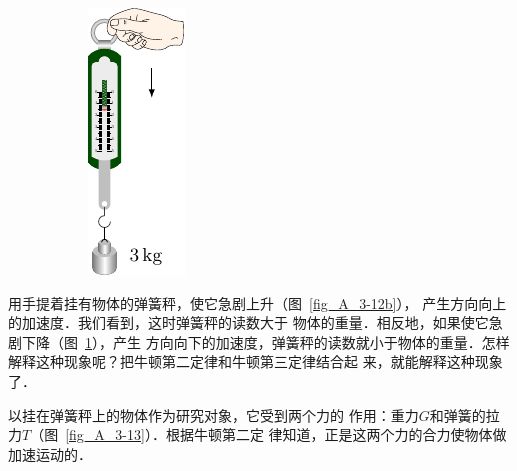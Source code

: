 \begin{figure}[htbp]
	\hfil
	\begin{subfigure} {0.3\linewidth} 
		\centering
		\includegraphics{fig/A/3-12c.pdf} 
		\caption{}\label{fig_A_3-12c} 
	\end{subfigure}
	\caption{}\label{fig_A_3-12}
\end{figure}



    用手提着挂有物体的弹簧秤，使它急剧上升（图~\ref{fig_A_3-12b}），
产生方向向上的加速度．我们看到，这时弹簧秤的读数大于
物体的重量．相反地，如果使它急剧下降（图~\ref{fig_A_3-12c}），产生
方向向下的加速度，弹簧秤的读数就小于物体的重量．怎样
解释这种现象呢？把牛顿第二定律和牛顿第三定律结合起
来，就能解释这种现象了．


    以挂在弹簧秤上的物体作为研究对象，它受到两个力的
作用：重力$G$和弹簧的拉力$T$（图~\ref{fig_A_3-13}）．根据牛顿第二定
律知道，正是这两个力的合力使物体做加速运动的．

